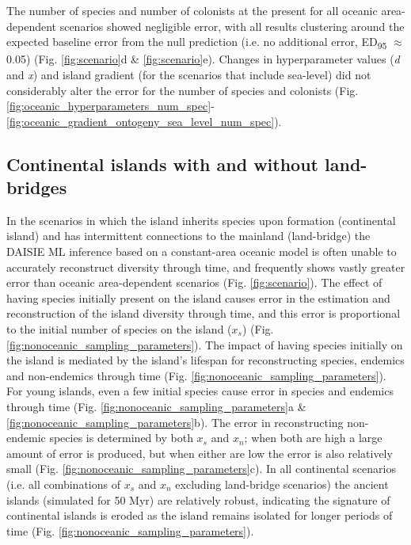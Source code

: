 \documentclass{article}
\begin{document}
The number of species and number of colonists at the present for all oceanic area-dependent scenarios showed negligible error, with all results clustering around the expected baseline error from the null prediction (i.e. no additional error, ED\textsubscript{95} $\approx$ 0.05) (Fig. \ref{fig:scenario}d \& \ref{fig:scenario}e). Changes in hyperparameter values (\textit{d} and \textit{x}) and island gradient (for the scenarios that include sea-level) did not considerably alter the error for the number of species and colonists (Fig. \ref{fig:oceanic_hyperparameters_num_spec}-\ref{fig:oceanic_gradient_ontogeny_sea_level_num_spec}).

\subsection*{Continental islands with and without land-bridges}

In the scenarios in which the island inherits species upon formation (continental island) and has intermittent connections to the mainland (land-bridge) the DAISIE ML inference based on a constant-area oceanic model is often unable to accurately reconstruct diversity through time, and frequently shows vastly greater error than oceanic area-dependent scenarios (Fig. \ref{fig:scenario}). The effect of having species initially present on the island causes error in the estimation and reconstruction of the island diversity through time, and this error is proportional to the initial number of species on the island ($x_s$) (Fig. \ref{fig:nonoceanic_sampling_parameters}). The impact of having species initially on the island is mediated by the island’s lifespan for reconstructing species, endemics and non-endemics through time (Fig. \ref{fig:nonoceanic_sampling_parameters}). For young islands, even a few initial species cause error in species and endemics through time (Fig. \ref{fig:nonoceanic_sampling_parameters}a \& \ref{fig:nonoceanic_sampling_parameters}b). The error in reconstructing non-endemic species is determined by both $x_s$ and $x_n$; when both are high a large amount of error is produced, but when either are low the error is also relatively small (Fig. \ref{fig:nonoceanic_sampling_parameters}c). In all continental scenarios (i.e. all combinations of $x_s$ and $x_n$ excluding land-bridge scenarios) the ancient islands (simulated for 50 Myr) are relatively robust, indicating the signature of continental islands is eroded as the island remains isolated for longer periods of time (Fig. \ref{fig:nonoceanic_sampling_parameters}). \\
\end{document}
